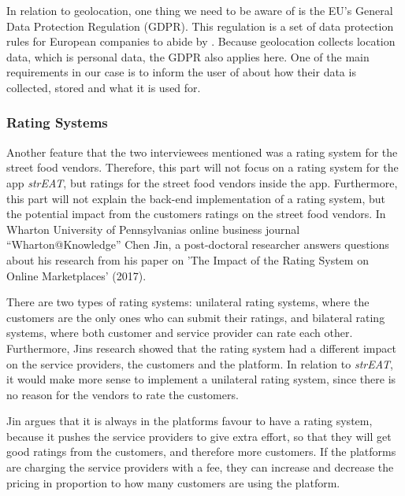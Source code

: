 In relation to geolocation, one thing we need to be aware of is the EU’s General Data Protection Regulation (GDPR). This regulation is a set of data protection rules for European companies to abide by \cite{GDPR_Dataprotection}. Because geolocation collects location data, which is personal data, the GDPR  also applies here. One of the main requirements in our case is to inform the user of about how their data is collected, stored and what it is used for.

\subsubsection{Rating Systems}
Another feature that the two interviewees mentioned was a rating system for the street food vendors. Therefore, this part will not focus on a rating system for the app \textit{strEAT}, but ratings for the street food vendors inside the app. Furthermore, this part will not explain the back-end implementation of a rating system, but the potential impact from the customers ratings on the street food vendors. In Wharton University of Pennsylvanias online business journal “Wharton@Knowledge” Chen Jin, a post-doctoral researcher answers questions about his research from his paper on 'The Impact of the Rating System on Online Marketplaces' (2017). \cite{RatingsystemsImpact}

There are two types of rating systems: unilateral rating systems, where the customers are the only ones who can submit their ratings, and bilateral rating systems, where both customer and service provider can rate each other. Furthermore, Jins research showed that the rating system had a different impact on the service providers, the customers and the platform.
In relation to \textit{strEAT}, it would make more sense to implement a unilateral rating system, since there is no reason for the vendors to rate the customers.

Jin argues that it is always in the platforms favour to have a rating system, because it pushes the service providers to give extra effort, so that they will get good ratings from the customers, and therefore more customers. If the platforms are charging the service providers with a fee, they can increase and decrease the pricing in proportion to how many customers are using the platform.

